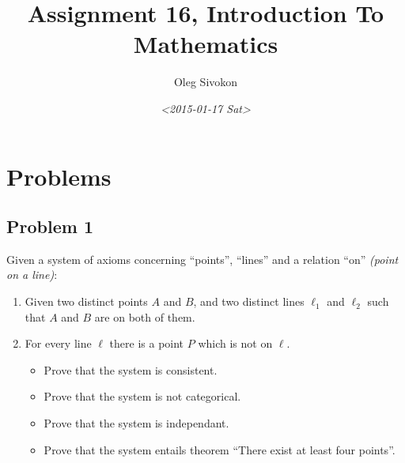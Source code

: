 \documentclass[11pt]{article}
\author{Oleg Sivokon}
\date{\textit{<2015-01-17 Sat>}}
\title{Assignment 16, Introduction To Mathematics}
\begin{document}
\maketitle
\tableofcontents



\clearpage

\section{Problems}
\label{sec-1}

\subsection{Problem 1}
\label{sec-1-1}
Given a system of axioms concerning ``points'', ``lines'' and a relation
``on'' \emph{(point on a line)}:

\begin{enumerate}
\item Given two distinct points $A$ and $B$, and two distinct lines $\ell_1$
and $\ell_2$ such that $A$ and $B$ are on both of them.
\item For every line $\ell$ there is a point $P$ which is not on $\ell$.
\begin{itemize}
\item Prove that the system is consistent.
\item Prove that the system is not categorical.
\item Prove that the system is independant.
\item Prove that the system entails theorem ``There exist at least four points''.
\end{itemize}
\end{enumerate}
\end{document}
